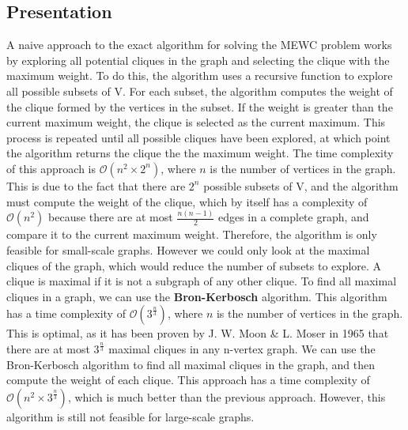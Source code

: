 \subsection{Presentation}

A naive approach to the exact algorithm for solving the MEWC problem works by
exploring all potential cliques in the graph and selecting the clique with the
maximum weight. To do this, the algorithm uses a recursive function to explore
all possible subsets of V. For each subset, the algorithm computes the weight of
the clique formed by the vertices in the subset. If the weight is greater than the
current maximum weight, the clique is selected as the current maximum. This
process is repeated until all possible cliques have been explored, at which point
the algorithm returns the clique the the maximum weight.
\newline \newline
The time complexity of this approach is $\mathcal{O}(n^2\times2^n)$, where $n$
is the number of vertices in the graph. This is due to the fact that there are
$2^n$ possible subsets of V, and the algorithm must compute the weight of the clique,
which by itself has a complexity of $\mathcal{O}(n^2)$ because there are at most
$\frac{n(n-1)}{2}$ edges in a complete graph, and compare it to the current
maximum weight. Therefore, the algorithm is only feasible for small-scale graphs.
\newline \newline
However we could only look at the maximal cliques of the graph, which would
reduce the number of subsets to explore. A clique is maximal if it is not a
subgraph of any other clique. To find all maximal cliques in a graph, we can use
the \textbf{Bron-Kerbosch} algorithm\cite{finding-all-cliques-of-an-undirected-graph}.
This algorithm has a time complexity of $\mathcal{O}(3^{\frac{n}{3}})$, where $n$
is the number of vertices in the graph. This is optimal, as it has been proven by
J. W. Moon \& L. Moser in 1965\cite{on-cliques-in-graphs} that there are at most
$3^{\frac{n}{3}}$ maximal cliques in any n-vertex graph.
\newline \newline
We can use the Bron-Kerbosch algorithm to find all maximal cliques in the graph,
and then compute the weight of each clique. This approach has a time complexity of
$\mathcal{O}(n^2\times3^{\frac{n}{3}})$, which is much better than the previous
approach. However, this algorithm is still not feasible for large-scale graphs.